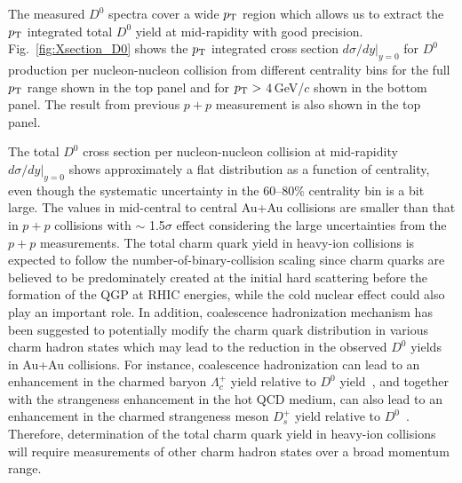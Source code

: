 \documentclass[%
 reprint,	
 amsmath,amssymb,
 aps,
 prc,
]{revtex4-1}
\begin{document}
The measured $D^0$ spectra cover a wide $p_{\rm T}$ region which allows us to extract the $p_{\rm T}$ integrated total $D^0$ yield at mid-rapidity with good precision. Fig.~\ref{fig:Xsection_D0} shows the $p_{\rm T}$ integrated cross section $d\sigma/dy|_{y=0}$ for $D^0$ production per nucleon-nucleon collision from different centrality bins for the full $p_{\rm T}$ range shown in the top panel and for $p_{\rm T}>$ 4\,GeV/$c$ shown in the bottom panel. The result from previous $p+p$ measurement is also shown in the top panel.

The total $D^0$ cross section per nucleon-nucleon collision at mid-rapidity $d\sigma/dy|_{y=0}$ shows approximately a flat distribution as a function of centrality, even though the systematic uncertainty in the 60--80\% centrality bin is a bit large. The values in mid-central to central Au+Au collisions are smaller than that in $p+p$ collisions with $\sim$ 1.5$\sigma$ effect considering the large uncertainties from the $p+p$ measurements. The total charm quark yield in heavy-ion collisions is expected to follow the number-of-binary-collision scaling since charm quarks are believed to be predominately created at the initial hard scattering before the formation of the QGP at RHIC energies, while the cold nuclear effect could also play an important role. In addition, coalescence hadronization mechanism has been suggested to potentially modify the charm quark distribution in various charm hadron states which may lead to the reduction in the observed $D^0$ yields in Au+Au collisions. For instance, coalescence hadronization can lead to an enhancement in the charmed baryon $\Lambda_{c}^+$ yield relative to $D^0$ yield~\cite{Oh2009}, and together with the strangeness enhancement in the hot QCD medium, can also lead to an enhancement in the charmed strangeness meson $D_{s}^+$ yield relative to $D^0$~\cite{He2013}. Therefore, determination of the total charm quark yield in heavy-ion collisions will require measurements of other charm hadron states over a broad momentum range.
\end{document}
